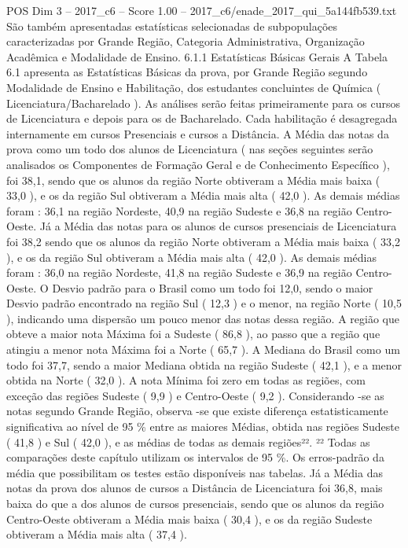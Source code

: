 \begin{textsample}{POS Dim 3 – 2017\_c6 – Score 1.00 – 2017\_c6/enade\_2017\_qui\_5a144fb539.txt}
São também apresentadas estatísticas selecionadas de subpopulações caracterizadas por Grande Região, Categoria Administrativa, Organização Acadêmica e Modalidade de Ensino. 6.1.1 Estatísticas Básicas Gerais A Tabela 6.1 apresenta as Estatísticas Básicas da prova, por Grande Região segundo Modalidade de Ensino e Habilitação, dos estudantes concluintes de Química ( Licenciatura/Bacharelado ).
As análises serão feitas primeiramente para os cursos de Licenciatura e depois para os de Bacharelado.
Cada habilitação é desagregada internamente em cursos Presenciais e cursos a Distância.
A Média das notas da prova como um todo dos alunos de Licenciatura ( nas seções seguintes serão analisados os Componentes de Formação Geral e de Conhecimento Específico ), foi 38,1, sendo que os alunos da região Norte obtiveram a Média mais baixa ( 33,0 ), e os da região Sul obtiveram a Média mais alta ( 42,0 ).
As demais médias foram : 36,1 na região Nordeste, 40,9 na região Sudeste e 36,8 na região Centro-Oeste.
Já a Média das notas para os alunos de cursos presenciais de Licenciatura foi 38,2 sendo que os alunos da região Norte obtiveram a Média mais baixa ( 33,2 ), e os da região Sul obtiveram a Média mais alta ( 42,0 ).
As demais médias foram : 36,0 na região Nordeste, 41,8 na região Sudeste e 36,9 na região Centro-Oeste.
O Desvio padrão para o Brasil como um todo foi 12,0, sendo o maior Desvio padrão encontrado na região Sul ( 12,3 ) e o menor, na região Norte ( 10,5 ), indicando uma dispersão um pouco menor das notas dessa região.
A região que obteve a maior nota Máxima foi a Sudeste ( 86,8 ), ao passo que a região que atingiu a menor nota Máxima foi a Norte ( 65,7 ).
A Mediana do Brasil como um todo foi 37,7, sendo a maior Mediana obtida na região Sudeste ( 42,1 ), e a menor obtida na Norte ( 32,0 ).
A nota Mínima foi zero em todas as regiões, com exceção das regiões Sudeste ( 9,9 ) e Centro-Oeste ( 9,2 ).
Considerando -se as notas segundo Grande Região, observa -se que existe diferença estatisticamente significativa ao nível de 95 \% entre as maiores Médias, obtida nas regiões Sudeste ( 41,8 ) e Sul ( 42,0 ), e as médias de todas as demais regiões²². ²² Todas as comparações deste capítulo utilizam os intervalos de 95 \%.
Os erros-padrão da média que possibilitam os testes estão disponíveis nas tabelas.
Já a Média das notas da prova dos alunos de cursos a Distância de Licenciatura foi 36,8, mais baixa do que a dos alunos de cursos presenciais, sendo que os alunos da região Centro-Oeste obtiveram a Média mais baixa ( 30,4 ), e os da região Sudeste obtiveram a Média mais alta ( 37,4 ).

\end{textsample}
